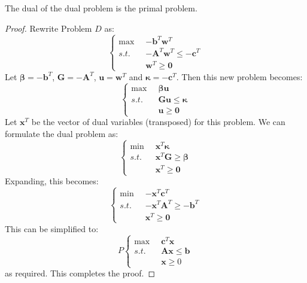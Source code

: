 \begin{lemma} The dual of the dual problem is the primal problem.
\label{lem:DualDual}
\end{lemma}
\begin{proof} Rewrite Problem $D$ as:
\begin{equation}
\left\{
\begin{aligned}
\max\;\; & -\mathbf{b}^T\mathbf{w}^T\\
s.t.\;\; & -\mathbf{A}^T\mathbf{w}^T \leq -\mathbf{c}^T\\
& \mathbf{w}^T \geq \mathbf{0}
\end{aligned}\right.
\end{equation}
Let $\boldsymbol{\beta} = -\mathbf{b}^T$, $\mathbf{G} = -\mathbf{A}^T$, $\mathbf{u} = \mathbf{w}^T$ and $\boldsymbol{\kappa} = -\mathbf{c}^T$. Then this new problem becomes:
\begin{equation}
\left\{
\begin{aligned}
\max\;\; & \boldsymbol{\beta}\mathbf{u}\\
s.t.\;\; & \mathbf{G}\mathbf{u} \leq \boldsymbol{\kappa}\\
& \mathbf{u} \geq \mathbf{0}
\end{aligned}\right.
\end{equation}
Let $\mathbf{x}^T$ be the vector of dual variables (transposed) for this problem. We can formulate the dual problem as:
\begin{equation}
\left\{
\begin{aligned}
\min\;\; & \mathbf{x}^T\boldsymbol{\kappa}\\
s.t.\;\; & \mathbf{x}^T\mathbf{G} \geq \boldsymbol{\beta}\\
& \mathbf{x}^T \geq \mathbf{0}
\end{aligned}\right.
\end{equation}
Expanding, this becomes:
\begin{equation}
\left\{
\begin{aligned}
\min\;\; & -\mathbf{x}^T\mathbf{c}^T\\
s.t.\;\; & -\mathbf{x}^T\mathbf{A}^T \geq -\mathbf{b}^T\\
& \mathbf{x}^T \geq \mathbf{0}
\end{aligned}\right.
\end{equation}
This can be simplified to:
\begin{equation}
P\left\{
\begin{aligned}
\max\;\; & \mathbf{c}^T\mathbf{x}\\
s.t.\;\; & \mathbf{A}\mathbf{x} \leq \mathbf{b}\\
& \mathbf{x} \geq 0
\end{aligned}\right.
\end{equation}
as required. This completes the proof.
\end{proof}

